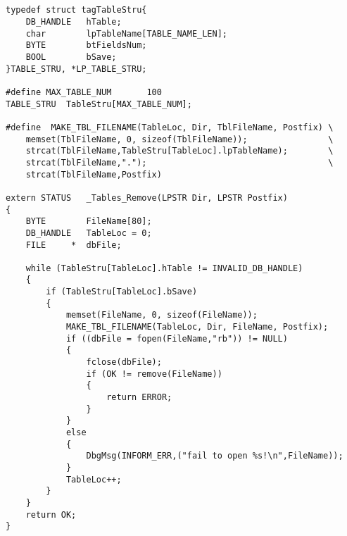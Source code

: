 ﻿\documentclass  [11pt,twocolumn]{article}
\begin{document}
\subsection{}
\begin{lstlisting}
typedef struct tagTableStru{
	DB_HANDLE	hTable;
	char		lpTableName[TABLE_NAME_LEN];
	BYTE		btFieldsNum;
	BOOL		bSave;
}TABLE_STRU, *LP_TABLE_STRU;

#define MAX_TABLE_NUM       100
TABLE_STRU	TableStru[MAX_TABLE_NUM];

#define  MAKE_TBL_FILENAME(TableLoc, Dir, TblFileName, Postfix) \
	memset(TblFileName, 0, sizeof(TblFileName));                \
	strcat(TblFileName,TableStru[TableLoc].lpTableName);        \
	strcat(TblFileName,".");                                    \
	strcat(TblFileName,Postfix)

extern STATUS	_Tables_Remove(LPSTR Dir, LPSTR Postfix)
{
	BYTE 		FileName[80];
	DB_HANDLE 	TableLoc = 0;
	FILE     * 	dbFile;

	while (TableStru[TableLoc].hTable != INVALID_DB_HANDLE)
	{
		if (TableStru[TableLoc].bSave)
		{
  			memset(FileName, 0, sizeof(FileName));
  			MAKE_TBL_FILENAME(TableLoc, Dir, FileName, Postfix);
			if ((dbFile = fopen(FileName,"rb")) != NULL)
			{
				fclose(dbFile);
     			if (OK != remove(FileName))
				{
  					return ERROR;
				}
			}
			else
			{
                DbgMsg(INFORM_ERR,("fail to open %s!\n",FileName));
            }
			TableLoc++;
   		}
    }
	return OK;
}
\end{lstlisting}
\end{document}
